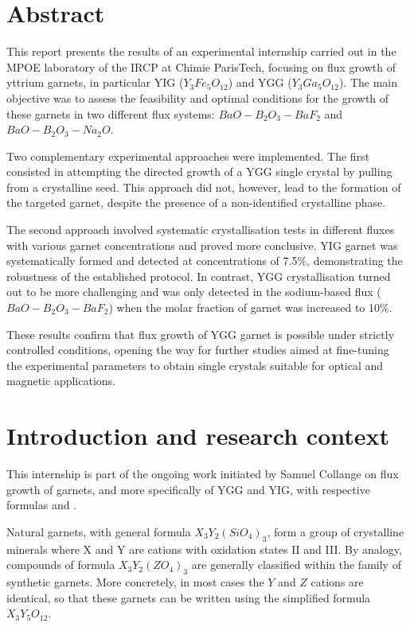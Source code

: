 \documentclass{rapportENSCP}
\begin{document}
\section{Abstract}
This report presents the results of an experimental internship carried out in the MPOE laboratory of the IRCP at Chimie ParisTech, focusing on flux growth of yttrium garnets, in particular YIG ($Y_3Fe_5O_{12}$) and YGG ($Y_3Ga_5O_{12}$). The main objective was to assess the feasibility and optimal conditions for the growth of these garnets in two different flux systems: $BaO-B_2O_3-BaF_2$ and $BaO-B_2O_3-Na_2O$.

Two complementary experimental approaches were implemented. The first consisted in attempting the directed growth of a YGG single crystal by pulling from a crystalline seed. This approach did not, however, lead to the formation of the targeted garnet, despite the presence of a non-identified crystalline phase.

The second approach involved systematic crystallisation tests in different fluxes with various garnet concentrations and proved more conclusive. YIG garnet was systematically formed and detected at concentrations of 7.5\%, demonstrating the robustness of the established protocol. In contrast, YGG crystallisation turned out to be more challenging and was only detected in the sodium-based flux ($BaO-B_2O_3-BaF_2$) when the molar fraction of garnet was increased to 10\%.

These results confirm that flux growth of YGG garnet is possible under strictly controlled conditions, opening the way for further studies aimed at fine-tuning the experimental parameters to obtain single crystals suitable for optical and magnetic applications.

\section{Introduction and research context}
This internship is part of the ongoing work initiated by Samuel Collange on flux growth of garnets, and more specifically of YGG and YIG, with respective formulas \YGG and \YIG.

Natural garnets, with general formula $X_3Y_2(SiO_4)_3$, form a group of crystalline minerals where X and Y are cations with oxidation states II and III. By analogy, compounds of formula $X_3Y_2(ZO_4)_3$ are generally classified within the family of synthetic garnets. More concretely, in most cases the $Y$ and $Z$ cations are identical, so that these garnets can be written using the simplified formula $X_3Y_5O_{12}$.
\end{document}
